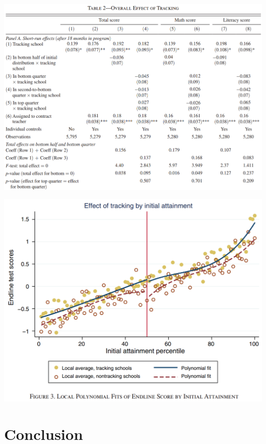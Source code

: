 \documentclass[9pt]{beamer}
\numberwithin{equation}{section}
\begin{document}
\begin{frame}
  \includegraphics[width= \textwidth]{results}
\end{frame}


\begin{frame}
  \includegraphics[width= \textwidth]{polynomial}
\end{frame}




\section{Conclusion}


\end{document}
